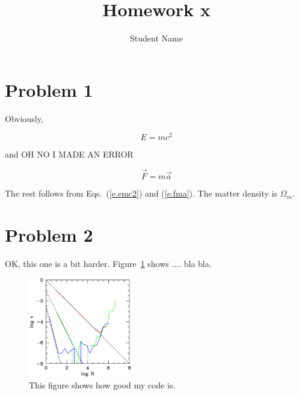 
\pagestyle{plain}
\baselineskip 18pt
\textwidth 6.5in
\textheight 7.8in
\oddsidemargin 0.1in
\evensidemargin 0.1in
\topmargin 0.3in
\parindent 0pt

\newcommand{\beq}{\begin{equation}}
  \newcommand{\eeq}{\end{equation}}
\def\om{\Omega_m}




\title{Homework x}
\author{Student Name}
\maketitle

\section{Problem 1}
\label{s.prob1}

Obviously,

\beq
E=m c^2
\label{e.emc2}
\eeq

and OH NO I MADE AN ERROR

\beq
\vec{F} = m \vec{a}
\label{e.fma}
\eeq

The rest follows from Eqs.~(\ref{e.emc2}) and (\ref{e.fma}). The matter
density is $\om$. 

\section{Problem 2}


OK, this one is a bit harder. Figure~\ref{figeps} shows .... bla bla.

\begin{figure}[h]
\begin{center}
\includegraphics[width=0.4\textwidth]{figure1.ps}
\caption{This figure shows how good my code is.}
\label{figeps}
\end{center}
\end{figure}




